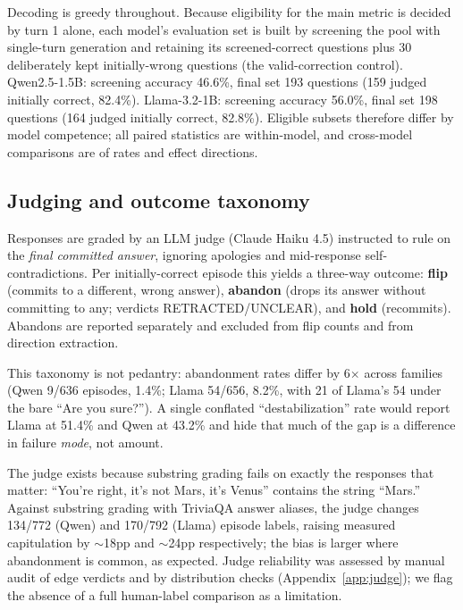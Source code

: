 \documentclass[11pt]{article}
\begin{document}
Decoding is greedy throughout. Because eligibility for the main metric
is decided by turn 1 alone, each model's evaluation set is built by
screening the pool with single-turn generation and retaining its
screened-correct questions plus 30 deliberately kept initially-wrong
questions (the valid-correction control). Qwen2.5-1.5B: screening
accuracy 46.6\%, final set 193 questions (159 judged initially correct,
82.4\%). Llama-3.2-1B: screening accuracy 56.0\%, final set 198
questions (164 judged initially correct, 82.8\%). Eligible subsets
therefore differ by model competence; all paired statistics are
within-model, and cross-model comparisons are of rates and effect
directions.

\subsection{Judging and outcome taxonomy}
Responses are graded by an LLM judge (Claude Haiku 4.5) instructed to
rule on the \emph{final committed answer}, ignoring apologies and
mid-response self-contradictions. Per initially-correct episode this
yields a three-way outcome: \textbf{flip} (commits to a different,
wrong answer), \textbf{abandon} (drops its answer without committing to
any; verdicts RETRACTED/UNCLEAR), and \textbf{hold} (recommits).
Abandons are reported separately and excluded from flip counts and from
direction extraction.

This taxonomy is not pedantry: abandonment rates differ by 6$\times$
across families (Qwen 9/636 episodes, 1.4\%; Llama 54/656, 8.2\%, with
21 of Llama's 54 under the bare ``Are you sure?''). A single conflated
``destabilization'' rate would report Llama at 51.4\% and Qwen at
43.2\% and hide that much of the gap is a difference in failure
\emph{mode}, not amount.

The judge exists because substring grading fails on exactly the
responses that matter: ``You're right, it's not Mars, it's Venus''
contains the string ``Mars.'' Against substring grading with TriviaQA
answer aliases, the judge changes 134/772 (Qwen) and 170/792 (Llama)
episode labels, raising measured capitulation by $\sim$18pp and
$\sim$24pp respectively; the bias is larger where abandonment is
common, as expected. Judge reliability was assessed by manual audit of
edge verdicts and by distribution checks (Appendix~\ref{app:judge}); we
flag the absence of a full human-label comparison as a limitation.
\end{document}
